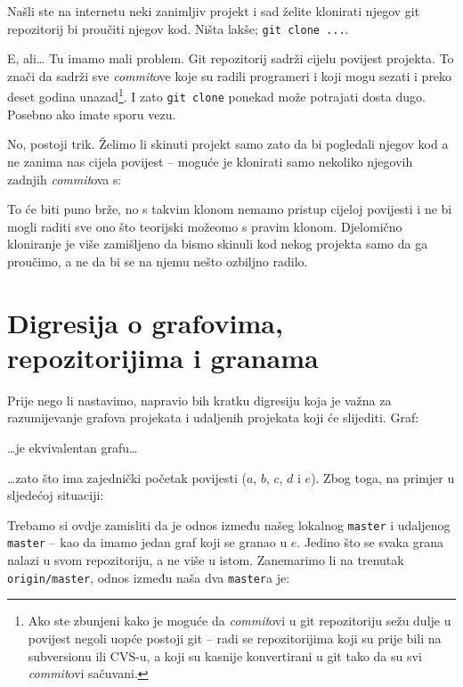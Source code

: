 Našli ste na internetu neki zanimljiv projekt i sad želite klonirati njegov git repozitorij bi proučiti njegov kod. 
Ništa lakše; \verb+git clone ...+.

E, ali\dots
Tu imamo mali problem.
Git repozitorij sadrži cijelu povijest projekta. 
To znači da sadrži sve \emph{commit}ove koje su radili programeri i koji mogu sezati i preko deset godina unazad\footnote{Ako ste zbunjeni kako je moguće da \emph{commit}ovi u git repozitoriju sežu dulje u povijest negoli uopće postoji git -- radi se repozitorijima koji su prije bili na subversionu ili CVS-u, a koji su kasnije konvertirani u git tako da su svi \emph{commit}ovi sačuvani.}.
I zato \verb+git clone+ ponekad može potrajati dosta dugo. 
Posebno ako imate sporu vezu.

No, postoji trik.
Želimo li skinuti projekt samo zato da bi pogledali njegov kod a ne zanima nas cijela povijest -- moguće je klonirati samo nekoliko njegovih zadnjih \emph{commit}ova s:


To će biti puno brže, no s takvim klonom nemamo pristup cijeloj povijesti i ne bi mogli raditi sve ono što teorijski možeomo s pravim klonom. 
Djelomično kloniranje je više zamišljeno da bismo skinuli kod nekog projekta samo da ga proučimo, a ne da bi se na njemu nešto ozbiljno radilo.

\section*{Digresija o grafovima, repozitorijima i granama}

Prije nego li nastavimo, napravio bih kratku digresiju koja je važna za razumijevanje grafova projekata i udaljenih projekata koji će slijediti.
Graf:



\dots{}je ekvivalentan grafu\dots



\dots{}zato što ima zajednički početak povijesti ($a$, $b$, $c$, $d$ i $e$).
Zbog toga, na primjer u sljedećoj situaciji:



Trebamo si ovdje zamisliti da je odnos između našeg lokalnog \verb+master+ i udaljenog \verb+master+ -- kao da imamo jedan graf koji se granao u $e$. Jedino što se svaka grana nalazi u svom repozitoriju, a ne više u istom.
Zanemarimo li na trenutak \verb+origin/master+, odnos između naša dva \verb+master+a je:

